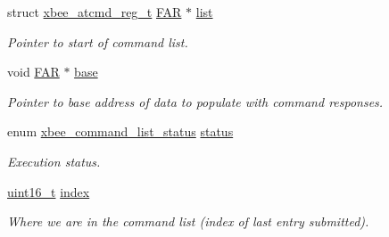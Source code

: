\begin{DoxyCompactItemize}
\item 
\hypertarget{structxbee__command__list__context__t_a4ad899975a163214cad51144f77bf0fc}{struct \hyperlink{structxbee__atcmd__reg__t}{xbee\-\_\-atcmd\-\_\-reg\-\_\-t} \hyperlink{group__hal_gaef060b3456fdcc093a7210a762d5f2ed}{F\-A\-R} $\ast$ \hyperlink{structxbee__command__list__context__t_a4ad899975a163214cad51144f77bf0fc}{list}}\label{structxbee__command__list__context__t_a4ad899975a163214cad51144f77bf0fc}

\begin{DoxyCompactList}\small\item\em Pointer to start of command list. \end{DoxyCompactList}\item 
\hypertarget{structxbee__command__list__context__t_ae7bcc11b5181c49ed31113d5beb67c3c}{void \hyperlink{group__hal_gaef060b3456fdcc093a7210a762d5f2ed}{F\-A\-R} $\ast$ \hyperlink{structxbee__command__list__context__t_ae7bcc11b5181c49ed31113d5beb67c3c}{base}}\label{structxbee__command__list__context__t_ae7bcc11b5181c49ed31113d5beb67c3c}

\begin{DoxyCompactList}\small\item\em Pointer to base address of data to populate with command responses. \end{DoxyCompactList}\item 
\hypertarget{structxbee__command__list__context__t_aa870726aac9643f0e8fa42ba9df544ca}{enum \hyperlink{group__xbee__atcmd_ga3ec63530d743d1c91126c67493c3245d}{xbee\-\_\-command\-\_\-list\-\_\-status} \hyperlink{structxbee__command__list__context__t_aa870726aac9643f0e8fa42ba9df544ca}{status}}\label{structxbee__command__list__context__t_aa870726aac9643f0e8fa42ba9df544ca}

\begin{DoxyCompactList}\small\item\em Execution status. \end{DoxyCompactList}\item 
\hypertarget{structxbee__command__list__context__t_a852b86a2eaee9852ada7a43e61e311a2}{\hyperlink{group__hal_ga5a8b2dc9e45a9ee81a94ef304fb62505}{uint16\-\_\-t} \hyperlink{structxbee__command__list__context__t_a852b86a2eaee9852ada7a43e61e311a2}{index}}\label{structxbee__command__list__context__t_a852b86a2eaee9852ada7a43e61e311a2}

\begin{DoxyCompactList}\small\item\em Where we are in the command list (index of last entry submitted). \end{DoxyCompactList}\end{DoxyCompactItemize}


